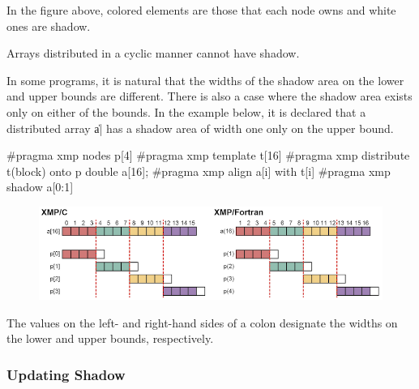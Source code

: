 In the figure above, colored elements are those that each node owns and
white ones are shadow.

\begin{mynote}
  Arrays distributed in a cyclic manner cannot have shadow.  
\end{mynote}


In some programs, it is natural that the widths of the shadow area on
the lower and upper bounds are different. There is also a case where the
shadow area exists only on either of the bounds. In the example below,
it is declared that a distributed array \|a| has a shadow area of width
one only on the upper bound.

\begin{XCexample}
#pragma xmp nodes p[4]
#pragma xmp template t[16]
#pragma xmp distribute t(block) onto p
double a[16];
#pragma xmp align a[i] with t[i]
#pragma xmp shadow a[0:1]
\end{XCexample}


\begin{figure}
  \centering
  \includegraphics[width=\textwidth]{figs/shadow_uneven.png}
\end{figure}

The values on the left- and right-hand sides of a colon designate the
widths on the lower and upper bounds, respectively.

\subsubsection{Updating Shadow}


